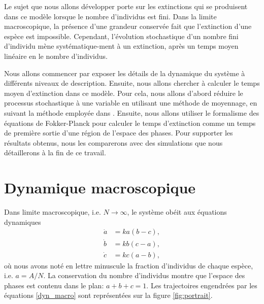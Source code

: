 \documentclass[openany,a4paper,12pt]{article}
\begin{document}
\par Le sujet que nous allons développer porte sur les extinctions qui se produisent dans ce modèle lorsque le nombre d'individus est fini. Dans la limite macroscopique, la présence d'une grandeur conservée fait que l'extinction d'une espèce est impossible. Cependant, l'évolution stochastique d'un nombre fini d'individu mène systématique-ment à un extinction, après un temps moyen linéaire en le nombre d'individus. 

\par Nous allons commencer par exposer les détails de la dynamique du système à différents niveaux de description. Ensuite, nous allons chercher à calculer le temps moyen d'extinction dans ce modèle. Pour cela, nous allons d'abord réduire le processus stochastique à une variable en utilisant une méthode de moyennage, en suivant la méthode employée dans \cite{frey2012}. Ensuite, nous allons utiliser le formalisme des équations de Fokker-Planck pour calculer le temps d'extinction comme un temps de première sortie d'une région de l'espace des phases. Pour supporter les résultats obtenus, nous les comparerons avec des simulations que nous détaillerons à la fin de ce travail. 


\section{Dynamique macroscopique}
\label{section_macro}

\par Dans limite macroscopique, i.e. $N\rightarrow \infty$, le système obéit aux équations dynamiques
%
\begin{equation}\label{dyn_macro}
\begin{split}
	\dot a &= ka(b-c), \\
	\dot b &= kb(c-a), \\
	\dot c &= kc(a-b),
\end{split}
\end{equation}
%
où nous avons noté en lettre minuscule la fraction d'individus de chaque espèce, i.e. $a=A/N$. La conservation du nombre d'individus montre que l'espace des phases est contenu dans le plan: $a+b+c=1$. Les trajectoires engendrées par les équations \ref{dyn_macro} sont représentées sur la figure \ref{fig:portrait}.
\end{document}
